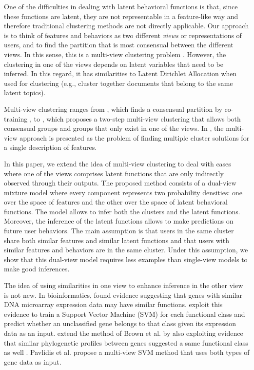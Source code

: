 \documentclass[smallextended]{svjour3}          %
\begin{document}
One of the difficulties in dealing with latent behavioral functions is that, since these functions are latent, they are not representable in a feature-like way and therefore traditional clustering methods are not directly applicable.
Our approach is to think of features and behaviors as two different \textit{views} or representations of users, and to find the partition that is most consensual between the different views. In this sense, this is a multi-view clustering problem \citep{SteffenandTobiasScheffer}. However, the clustering in one of the views depends on latent variables that need to be inferred. In this regard, it has similarities to Latent Dirichlet Allocation when used for clustering (e.g., cluster together documents that belong to the same latent topics).

Multi-view clustering ranges from \cite{Kumar2011}, which finds a consensual partition by co-training \citep{Mitchell1998}, to \cite{Greene2009a}, which proposes a two-step multi-view clustering that allows both consensual groups and groups that only exist in one of the views. In \cite{Niu2012}, the multi-view approach is presented as the problem of finding multiple cluster solutions for a single description of features.

In this paper, we extend the idea of multi-view clustering to deal with cases where one of the views comprises latent functions that are only indirectly observed through their outputs. The proposed method consists of a dual-view mixture model where every component represents two probability densities: one over the space of features and the other over the space of latent behavioral functions. The model allows to infer both the clusters and the latent functions.  Moreover, the inference of the latent functions allows to make predictions on future user behaviors. The main assumption is that users in the same cluster share both similar features and similar latent functions and that users with similar features and behaviors are in the same cluster. Under this assumption, we show that this dual-view model requires less examples than single-view models to make good inferences.


The idea of using similarities in one view to enhance inference in the other view is not new. In bioinformatics, \cite{Eisen1998} found evidence suggesting that genes with similar DNA microarray expression data may have similar functions. \cite{Brown2000} exploit this evidence to train a Support Vector Machine (SVM) for each functional class and predict whether an unclassified gene belongs to that class given its expression data as an input. \cite{Pavlidis2002} extend the method of Brown et al. by also exploiting evidence that similar phylogenetic profiles between genes suggested a same functional class as well \citep{Pellegrini1999a}. Pavlidis et al. propose a multi-view SVM method that uses both types of gene data as input.
 
\end{document}
